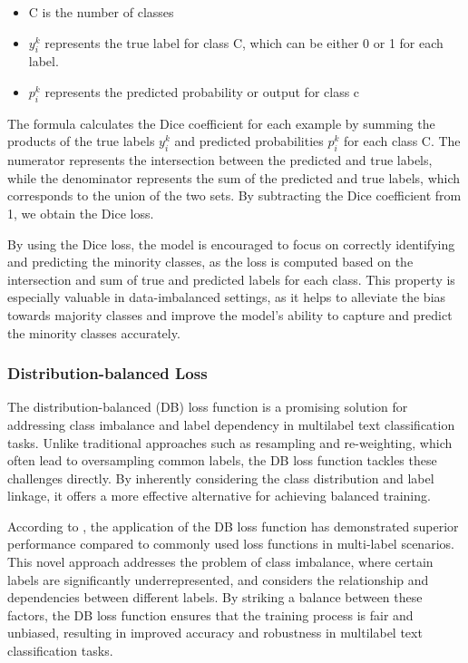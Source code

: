 \begin{itemize}
\item{C is the number of classes}
\item{\(y_i^k\) represents the true label for class C, which can be either 0 or 1 for each label.}
\item{\(p_i^k\) represents the predicted probability or output for class c}

\end{itemize}
The formula calculates the Dice coefficient for each example by summing the products of the true labels \(y_i^k\) and predicted probabilities \(p_i^k\) for each class C. The numerator represents the intersection between the predicted and true labels, while the denominator represents the sum of the predicted and true labels, which corresponds to the union of the two sets. By subtracting the Dice coefficient from 1, we obtain the Dice loss.

By using the Dice loss, the model is encouraged to focus on correctly identifying and predicting the minority classes, as the loss is computed based on the intersection and sum of true and predicted labels for each class. This property is especially valuable in data-imbalanced settings, as it helps to alleviate the bias towards majority classes and improve the model's ability to capture and predict the minority classes accurately.

\subsubsection{Distribution-balanced Loss}

The distribution-balanced (DB) loss function is a promising solution for addressing class imbalance and label dependency in multilabel text classification tasks. Unlike traditional approaches such as resampling and re-weighting, which often lead to oversampling common labels, the DB loss function tackles these challenges directly. By inherently considering the class distribution and label linkage, it offers a more effective alternative for achieving balanced training.

According to \cite{huang-etal-2021-balancing}, the application of the DB loss function has demonstrated superior performance compared to commonly used loss functions in multi-label scenarios. This novel approach addresses the problem of class imbalance, where certain labels are significantly underrepresented, and considers the relationship and dependencies between different labels. By striking a balance between these factors, the DB loss function ensures that the training process is fair and unbiased, resulting in improved accuracy and robustness in multilabel text classification tasks. 

